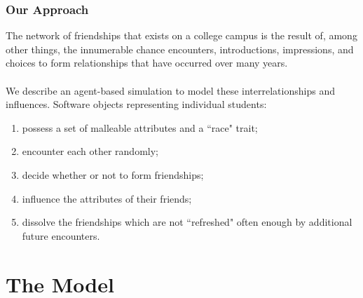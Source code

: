 \documentclass{beamer}
\begin{document}
\begin{frame}
\frametitle{Our Approach}
The network of friendships that exists on a college campus is the result of, among other things, the innumerable chance encounters, introductions, impressions, and choices to form relationships that have occurred over many years.\\

~~\\

We describe an agent-based simulation to model these interrelationships and influences. Software objects representing individual students:
\begin{enumerate}
\item possess a set of malleable attributes and a ``race" trait;
\item encounter each other randomly;
\item decide whether or not to form friendships;
\item influence the attributes of their friends;
\item dissolve the friendships which are not ``refreshed" often enough by additional future encounters.
\end{enumerate}
\end{frame}


%
%
%

\section{The Model}
\end{document}
